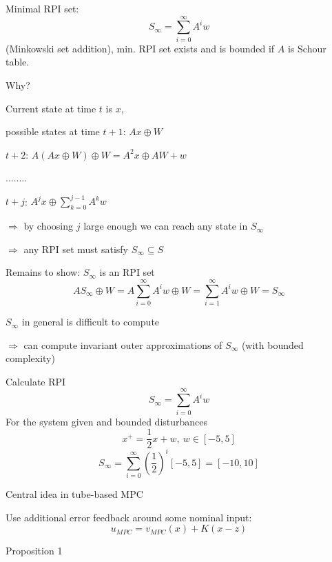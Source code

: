 Minimal RPI set:
\begin{equation*}
S_{\infty} = \sum_{i = 0}^{\infty} A^iw
\end{equation*}
(Minkowski set addition), min. RPI set exists and is bounded if $A$ is Schour table.

Why?

Current state at time $t$ is $x$,

possible states at time $t+1$: $Ax \oplus W$
                        
$t+2$: $A(Ax \oplus W) \oplus W = A^2x \oplus AW + w$
  
       ........
        
$t+j$: $A^jx \oplus \sum_{k=0}^{j-1}A^kw$

$\Rightarrow$ by choosing $j$ large enough we can reach any state in $S_{\infty}$

$\Rightarrow$ any RPI set must satisfy $S_{\infty} \subseteq S$

Remains to show: $S_{\infty}$ is an RPI set
\begin{equation*}
AS_{\infty} \oplus W = A\sum_{i=0}^{\infty}A^iw \oplus W = \sum_{i=1}^{\infty}A^iw \oplus W = S_{\infty} 
\end{equation*}

$S_{\infty}$ in  general is difficult to compute 

$\Rightarrow$ can compute invariant outer approximations of $S_{\infty}$ (with bounded complexity)

\begin{Example} 

Calculate RPI 
\begin{equation*}
S_{\infty} = \sum_{i=0}^{\infty} A^iw
\end{equation*}
For the system given and bounded disturbances
\begin{equation*}
x^+=\frac{1}{2}x + w, \ w \in [-5,5]
\end{equation*}
\begin{equation*}
S_{\infty} = \sum_{i=0}^{\infty}(\frac{1}{2})^i [-5,5] = [-10, 10]
\end{equation*}
\end{Example}

Central idea in tube-based MPC

Use additional error feedback around some nominal input:
\begin{equation*}
u_{MPC} = v_{MPC}(x) + K (x - z)
\end{equation*}

Proposition 1

